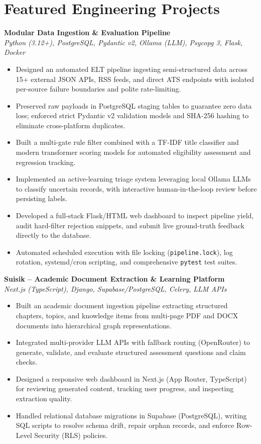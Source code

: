 \documentclass[a4paper,10pt]{article}
\begin{document}
\section*{Featured Engineering Projects}

\textbf{Modular Data Ingestion \& Evaluation Pipeline} \\
\textit{Python (3.12+), PostgreSQL, Pydantic v2, Ollama (LLM), Psycopg 3, Flask, Docker}
\begin{itemize}
    \item Designed an automated ELT pipeline ingesting semi-structured data across 15+ external JSON APIs, RSS feeds, and direct ATS endpoints with isolated per-source failure boundaries and polite rate-limiting.
    \item Preserved raw payloads in PostgreSQL staging tables to guarantee zero data loss; enforced strict Pydantic v2 validation models and SHA-256 hashing to eliminate cross-platform duplicates.
    \item Built a multi-gate rule filter combined with a TF-IDF title classifier and modern transformer scoring models for automated eligibility assessment and regression tracking.
    \item Implemented an active-learning triage system leveraging local Ollama LLMs to classify uncertain records, with interactive human-in-the-loop review before persisting labels.
    \item Developed a full-stack Flask/HTML web dashboard to inspect pipeline yield, audit hard-filter rejection snippets, and submit live ground-truth feedback directly to the database.
    \item Automated scheduled execution with file locking (\texttt{pipeline.lock}), log rotation, systemd/cron scripting, and comprehensive \texttt{pytest} test suites.
\end{itemize}

\vspace{3pt}
\textbf{Suisik -- Academic Document Extraction \& Learning Platform} \\
\textit{Next.js (TypeScript), Django, Supabase/PostgreSQL, Celery, LLM APIs}
\begin{itemize}
    \item Built an academic document ingestion pipeline extracting structured chapters, topics, and knowledge items from multi-page PDF and DOCX documents into hierarchical graph representations.
    \item Integrated multi-provider LLM APIs with fallback routing (OpenRouter) to generate, validate, and evaluate structured assessment questions and claim checks.
    \item Designed a responsive web dashboard in Next.js (App Router, TypeScript) for reviewing generated content, tracking user progress, and inspecting extraction quality.
    \item Handled relational database migrations in Supabase (PostgreSQL), writing SQL scripts to resolve schema drift, repair orphan records, and enforce Row-Level Security (RLS) policies.
\end{itemize}
\end{document}
